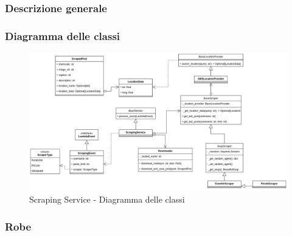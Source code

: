 \subsubsection{Descrizione generale}

\subsubsection{Diagramma delle classi}
\begin{figure}[H]
    \includegraphics[width=14cm]{sezioni/images/cd_scraping.png}
    \centering
    \caption{Scraping Service - Diagramma delle classi}
\end{figure}

\subsubsection{Robe}
